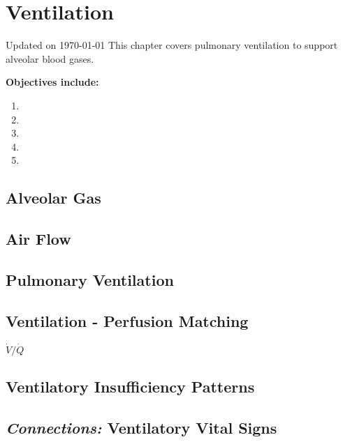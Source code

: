 \chapter{Ventilation}\label{chp:alveolar_oxygen}
Updated on \today
\minitoc
This chapter covers pulmonary ventilation to support alveolar blood gases.

\vspace{5mm}

\textbf{Objectives include:}
\begin{enumerate}
    \item
    \item
    \item
    \item
    \item
\end{enumerate}

\section{Alveolar Gas}

\section{Air Flow}

\section{Pulmonary Ventilation}

\section{Ventilation - Perfusion Matching}

$\dot{V}/\dot{Q}$

\section{Ventilatory Insufficiency Patterns}

\section{\textit{Connections:} Ventilatory Vital Signs}

\printbibliography[heading=subbibintoc]
